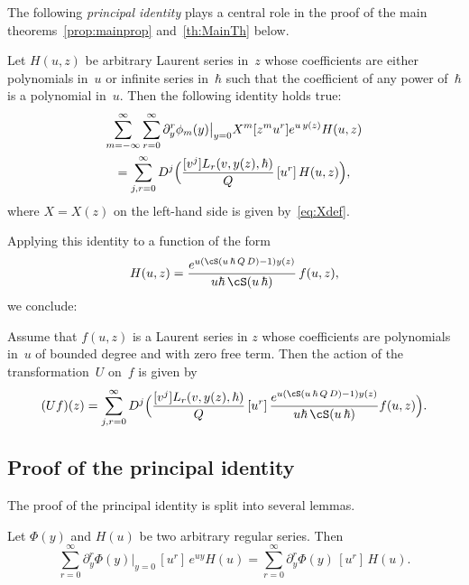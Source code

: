 The following \emph{principal identity} plays a central role in the proof of the main theorems~\ref{prop:mainprop} and~\ref{th:MainTh} below.
\begin{proposition}\label{prop:principal}
Let $H(u,z)$ be arbitrary Laurent series in~$z$ whose coefficients are either polynomials in~$u$ or infinite series in~$\hbar$ such that the coefficient of any power of~$\hbar$ is a polynomial in~$u$. Then the following identity holds true:
\begin{multline}\label{eq:princid}
\sum_{m=-\infty}^\infty \sum_{r=0}^\infty \partial_y^{r}\phi_{m}(y)\big|_{y=0}
X^m[z^m u^r]e^{u\,y(z)}H(u,z)\\
=\sum_{j,r=0}^\infty D^j\Bigl(\frac{[v^j]L_r(v,y(z),\hbar)}{Q}\,[u^r]\, H(u,z)\Bigr),
\end{multline}
where $X=X(z)$ on the left-hand side is given by~\eqref{eq:Xdef}.
\end{proposition}

Applying this identity to a function of the form
\[
H(u,z)=\frac{e^{u(\cS(u\,\hbar\,Q\,D)-1)y(z)}}{u\hbar\,\cS(u\,\hbar)}\,f(u,z),
\]
we conclude:

\begin{corollary}\label{cor:principal}
Assume that $f(u,z)$ is a Laurent series in $z$ whose coefficients are polynomials in~$u$ of bounded degree and with zero free term. Then the action of the transformation~$U$ on~$f$ is given by
\begin{equation}\label{eq:principal}
(U f)(z)=\sum_{j,r=0}^\infty D^j\Bigl(\frac{[v^j]L_r(v,y(z),\hbar)}{Q}\,[u^r]\, \frac{e^{u(\cS(u\,\hbar\,Q\,D)-1)y(z)}}{u\hbar\,\cS(u\,\hbar)}f(u,z)\Bigr).
\end{equation}
\end{corollary}

\subsection{Proof of the principal identity}
The proof of the principal identity is split into several lemmas.

\begin{lemma}\label{lem:L1}
Let $\Phi(y)$ and $H(u)$ be two arbitrary regular series. Then
\begin{equation}\label{eq:L1}
\sum_{r=0}^\infty \partial_y^r\Phi(y)\big|_{y=0} \,[u^r]\,e^{u y}H(u)=
\sum_{r=0}^\infty \partial_y^r\Phi(y) \,[u^r]\, H(u).
\end{equation}
\end{lemma}

